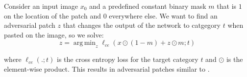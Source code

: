 \documentclass[10pt,twocolumn,letterpaper]{article}
\DeclareMathOperator*{\argmax}{arg\,max}
\DeclareMathOperator*{\argmin}{arg\,min}
\begin{document}
Consider an input image $x_0$ and a predefined constant binary mask $m$ that is $1$ on the location of the patch and $0$ everywhere else. We want to find an adversarial patch $z$ that changes the output of the network to catgegory $t$ when pasted on the image, so we solve:
$$ z = \argmin_{z} \ell_{ce}(x \odot (1-m)+z \odot m; t)$$

\noindent where $\ell_{ce}(.; t)$ is the cross entropy loss for the target category $t$
and $\odot$ is the element-wise product. This results in adversarial patches similar to \cite{brown2017adversarial}.




\end{document}
